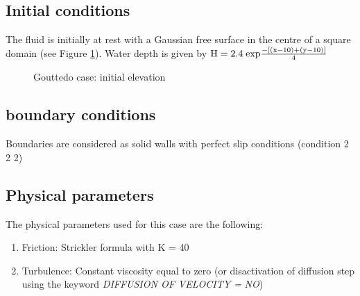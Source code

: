 \subsection{Initial conditions}
The fluid is initially at rest with a Gaussian free surface in the centre of a
square domain (see Figure \ref{fig:gouttedo_init}). Water depth is given by
${\rm H= 2.4\; exp}\frac{{\rm -}\left[{\rm (x-10)}+({\rm y-10)}\right]}{{\rm 4}} $

\begin{figure}[h]
\begin{center}
\end{center}
\caption{Gouttedo case: initial elevation}
\label{fig:gouttedo_init}
\end{figure}

\subsection{boundary conditions}
Boundaries are considered as solid walls with perfect slip conditions (condition 2 2 2)

%
%
%

%
%
\subsection{Physical parameters}
%
The physical parameters used for this case are the following:
\begin{enumerate}
\item Friction: Strickler formula with K = 40
\item Turbulence: Constant viscosity equal to zero (or disactivation of
  diffusion step using the keyword  \textit{DIFFUSION OF VELOCITY =}\textit{
  NO})
\end{enumerate}

